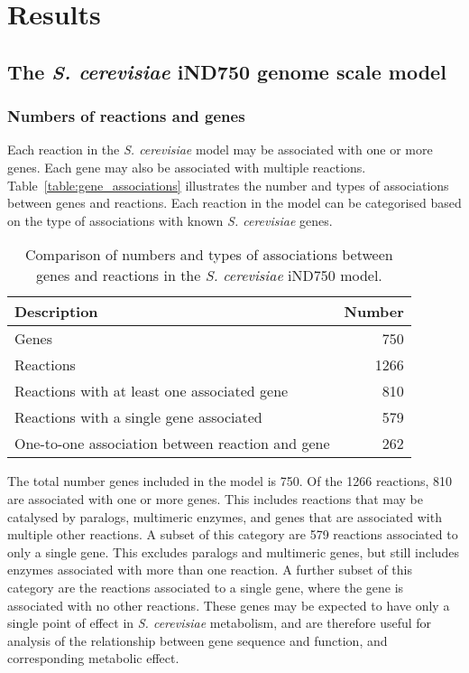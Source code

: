 \clearpage

\section{Results}%

\subsection{The \emph{S. cerevisiae} iND750 genome scale model}%

\subsubsection{Numbers of reactions and genes}%

Each reaction in the \emph{S. cerevisiae} model may be associated with one or more genes. Each gene may also be associated with multiple reactions. Table~\vref{table:gene_associations} illustrates the number and types of associations between genes and reactions. Each reaction in the model can be categorised based on the type of associations with known \emph{S. cerevisiae} genes.

\begin{table}[b]%
  \centering
  \begin{tabular}{l r}
                                                                   \toprule
    Description                                      & Number   \\ \midrule
    Genes                                            & 750      \\
    Reactions                                        & 1266     \\
    Reactions with at least one associated gene      & 810      \\
    Reactions with a single gene associated          & 579      \\
    One-to-one association between reaction and gene & 262      \\ \bottomrule
  \end{tabular}
  \caption[Gene associations in the \emph{S. cerevisiae} iND750 model]{Comparison of numbers and types of associations between genes and reactions in the \emph{S. cerevisiae} iND750 model. }
  \label{table:gene_associations}
\end{table}%

The total number genes included in the model is 750. Of the 1266 reactions, 810 are associated with one or more genes. This includes reactions that may be catalysed by paralogs, multimeric enzymes, and genes that are associated with multiple other reactions. A subset of this category are 579 reactions associated to only a single gene. This excludes paralogs and multimeric genes, but still includes enzymes associated with more than one reaction. A further subset of this category are the reactions associated to a single gene, where the gene is associated with no other reactions. These genes may be expected to have only a single point of effect in \emph{S. cerevisiae} metabolism, and are therefore useful for analysis of the relationship between gene sequence and function, and corresponding metabolic effect.

